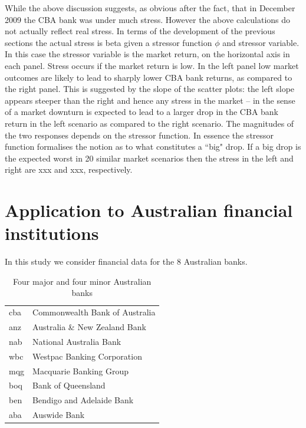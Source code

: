 \documentclass[authoryear]{elsarticle}
\begin{document}
While the above discussion suggests, as obvious after the fact, that in December 2009 the CBA bank was under much stress.   However the above calculations do not actually reflect real stress.   In terms of the development of the previous sections the actual stress is beta given a stressor function $\phi$ and stressor variable.   In this case the stressor variable is the market return, on the horizontal axis in each panel.   Stress occurs if the market return is low.   In the left panel low market outcomes are likely to lead to sharply lower CBA bank returns, as compared to the right panel.   This is suggested by the slope of the scatter plots:  the left slope appears steeper than the right and hence any stress in the market -- in the sense of a market downturn is expected to lead to a larger drop in the CBA bank return in the left scenario as compared to the right scenario.   The magnitudes of the two responses depends on the stressor function.   In essence the stressor function formalises the notion as to what constitutes a ``big" drop.   If a big drop is the expected worst in 20 similar market scenarios then the stress in the left and right are xxx and xxx, respectively.        



\section{Application to Australian financial institutions}

In this study we consider financial data for  the 8 Australian banks.

\begin{table}[htdp]
\caption{Four major and four minor Australian banks}
\begin{center}
\begin{tabular}{l|l}
\hline
cba & Commonwealth Bank of Australia\\
anz & Australia \& New Zealand Bank\\
nab & National Australia Bank\\
wbc & Westpac Banking Corporation\\
\hline
mqg & Macquarie Banking Group\\
boq & Bank of Queensland\\
ben & Bendigo and Adelaide Bank\\
aba & Auswide Bank\\
\hline
\end{tabular}
\end{center}
\label{banks}
\end{table}%
\end{document}
